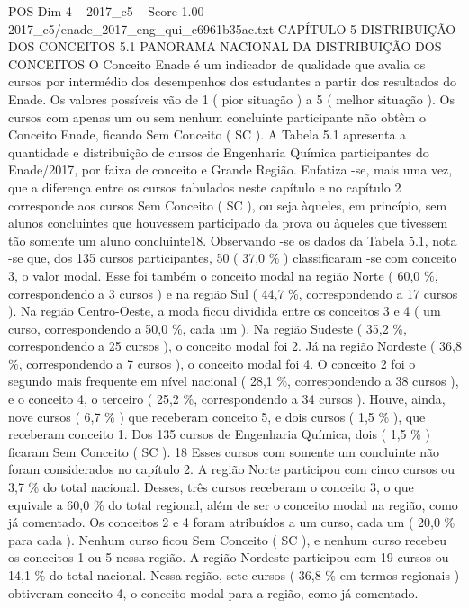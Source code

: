 \begin{textsample}{POS Dim 4 – 2017\_c5 – Score 1.00 – 2017\_c5/enade\_2017\_eng\_qui\_c6961b35ac.txt}  \label{ex:f4_pos_229}
CAPÍTULO 5 DISTRIBUIÇÃO DOS CONCEITOS 5.1 PANORAMA NACIONAL DA DISTRIBUIÇÃO DOS CONCEITOS O Conceito Enade é um indicador de qualidade que avalia os cursos por intermédio dos desempenhos dos estudantes a partir dos resultados do Enade.
Os valores possíveis vão de 1 ( pior situação ) a 5 ( melhor situação ).
Os cursos com apenas um ou sem nenhum concluinte participante não obtêm o Conceito Enade, ficando Sem Conceito ( SC ).
A Tabela 5.1 apresenta a quantidade e distribuição de cursos de Engenharia Química participantes do Enade/2017, por faixa de conceito e Grande Região.
Enfatiza -se, mais uma vez, que a diferença entre os cursos tabulados neste capítulo e no capítulo 2 corresponde aos cursos Sem Conceito ( SC ), ou seja àqueles, em princípio, sem alunos concluintes que houvessem participado da prova ou àqueles que tivessem tão somente um aluno concluinte18.
Observando -se os dados da Tabela 5.1, nota -se que, dos 135 cursos participantes, 50 ( 37,0 \% ) classificaram -se com conceito 3, o valor modal.
Esse foi também o conceito modal na região Norte ( 60,0 \%, correspondendo a 3 cursos ) e na região Sul ( 44,7 \%, correspondendo a 17 cursos ).
Na região Centro-Oeste, a moda ficou dividida entre os conceitos 3 e 4 ( um curso, correspondendo a 50,0 \%, cada um ).
Na região Sudeste ( 35,2 \%, correspondendo a 25 cursos ), o conceito modal foi 2.
Já na região Nordeste ( 36,8 \%, correspondendo a 7 cursos ), o conceito modal foi 4.
O conceito 2 foi o segundo mais frequente em nível nacional ( 28,1 \%, correspondendo a 38 cursos ), e o conceito 4, o terceiro ( 25,2 \%, correspondendo a 34 cursos ).
Houve, ainda, nove cursos ( 6,7 \% ) que receberam conceito 5, e dois cursos ( 1,5 \% ), que receberam conceito 1.
Dos 135 cursos de Engenharia Química, dois ( 1,5 \% ) ficaram Sem Conceito ( SC ). 18 Esses cursos com somente um concluinte não foram considerados no capítulo 2.
A região Norte participou com cinco cursos ou 3,7 \% do total nacional.
Desses, três cursos receberam o conceito 3, o que equivale a 60,0 \% do total regional, além de ser o conceito modal na região, como já comentado.
Os conceitos 2 e 4 foram atribuídos a um curso, cada um ( 20,0 \% para cada ).
Nenhum curso ficou Sem Conceito ( SC ), e nenhum curso recebeu os conceitos 1 ou 5 nessa região.
A região Nordeste participou com 19 cursos ou 14,1 \% do total nacional.
Nessa região, sete cursos ( 36,8 \% em termos regionais ) obtiveram conceito 4, o conceito modal para a região, como já comentado.

\end{textsample}
